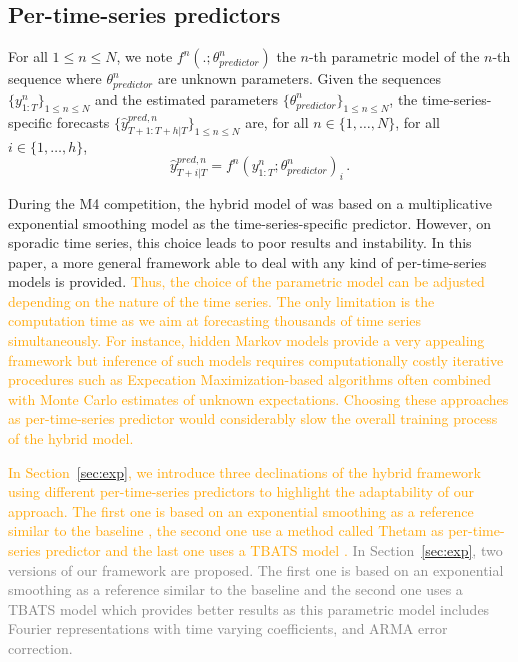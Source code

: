 \documentclass[10pt]{article} %
\newcommand{\ts}{y}
\newcommand{\tspred}{\widehat{\ts}}
\newcommand{\stat}{f}
\newcommand{\statparam}{\theta_{predictor}}
\newcommand{\lag}{h}
\begin{document}
\subsection{Per-time-series predictors}
For all $1\leqslant n \leqslant N$, we note $\stat^n(.;\statparam^n)$ the $n$-th parametric model of the $n$-th sequence where $\statparam^n$ are  unknown parameters. Given the sequences $\{\ts^n_{1:T}\}_{1\leqslant n \leqslant N}$ and the estimated  parameters $\{\statparam^n\}_{1\leqslant n \leqslant N}$, the time-series-specific forecasts $\{\tspred^{pred,n}_{T+1:T+\lag|T}\}_{1\leqslant n \leqslant N}$ are, for all $n \in \{1,\ldots,N\}$, for all $i \in \{1,\ldots,\lag\}$,
\begin{equation}
    \label{eq:predictors}
    \tspred^{pred,n}_{T+i|T} = \stat^n(\ts^n_{1:T};\statparam^n)_i\,.
\end{equation}

During the M4 competition, the hybrid model of \citet{smyl2020} was based on a multiplicative exponential smoothing model as the time-series-specific predictor. However, on sporadic time series, this choice leads to poor results and instability. In this paper, a more general framework able to deal with any kind of per-time-series models is provided. \textcolor{orange}{Thus, the choice of the parametric model can be adjusted depending on the nature of the time series. The only limitation is the computation time as we aim at forecasting thousands of time series simultaneously. For instance, hidden Markov models provide a very appealing framework but inference of such models requires computationally costly iterative procedures such as Expecation Maximization-based algorithms often combined with Monte Carlo estimates of unknown expectations. Choosing these approaches as per-time-series predictor would considerably slow the overall training process of the hybrid model.} 

\textcolor{orange}{In Section~\ref{sec:exp}, we introduce three declinations of the hybrid framework  using different per-time-series predictors to highlight the adaptability of our approach. The first one is based on an  exponential smoothing as a reference similar to the baseline \citet{smyl2020}, the second one use a method called Thetam as per-time-series predictor \citep{hyndman2020} and the last one uses a TBATS model \citep{alysha2011}.} \textcolor{gray}{In Section~\ref{sec:exp}, two versions of our framework are proposed. The first one is based on an  exponential smoothing as a reference similar to the baseline \citet{smyl2020} and the second one uses a TBATS model \citep{alysha2011} which provides better results as this parametric model includes  Fourier representations with time varying coefficients, and ARMA error correction.}
\end{document}
